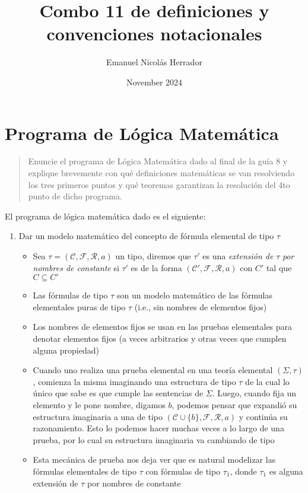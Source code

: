 \documentclass{article}
\title{Combo 11 de definiciones y convenciones notacionales}
\author{Emanuel Nicolás Herrador}
\date{November 2024}
\begin{document}
\maketitle

\section{Programa de Lógica Matemática}
\begin{quote}
  Enuncie el programa de Lógica Matemática dado al final de la guía $8$ y explique brevemente con qué definiciones matemáticas se van resolviendo los tres primeros puntos y qué teoremas garantizan la resolución del 4to punto de dicho programa.
\end{quote}
El programa de lógica matemática dado es el siguiente:
\begin{enumerate}
  \item Dar un modelo matemático del concepto de fórmula elemental de tipo $\tau$
        \begin{itemize}
          \item Sea $\tau=(\mathcal{C},\mathcal{F},\mathcal{R},a)$ un tipo, diremos que $\tau'$ es una \textit{extensión de} $\tau$ \textit{por nombres de constante} si $\tau'$ es de la forma $(\mathcal{C}',\mathcal{F},\mathcal{R},a)$ con $C'$ tal que $C\subseteq C'$
          \item Las fórmulas de tipo $\tau$ son un modelo matemático de las fórmulas elementales puras de tipo $\tau$ (i.e., sin nombres de elementos fijos)
          \item Los nombres de elementos fijos se usan en las pruebas elementales para denotar elementos fijos (a veces arbitrarios y otras veces que cumplen alguna propiedad)
          \item Cuando uno realiza una prueba elemental en una teoría elemental $(\Sigma,\tau)$, comienza la misma imaginando una estructura de tipo $\tau$ de la cual lo único que sabe es que cumple las sentencias de $\Sigma$. Luego, cuando fija un elemento y le pone nombre, digamos $b$, podemos pensar que expandió su estructura imaginaria a una de tipo $(\mathcal{C}\cup\{b\},\mathcal{F},\mathcal{R},a)$ y continúa su razonamiento. Esto lo podemos hacer muchas veces a lo largo de una prueba, por lo cual su estructura imaginaria va cambiando de tipo
          \item Esta mecánica de prueba nos deja ver que es natural modelizar las fórmulas elementales de tipo $\tau$ con fórmulas de tipo $\tau_1$, donde $\tau_1$ es alguna extensión de $\tau$ por nombres de constante

\end{itemize}
\end{enumerate}
\end{document}
